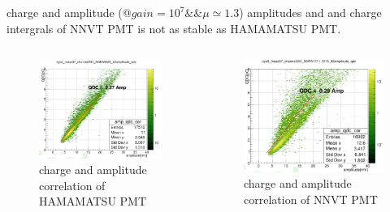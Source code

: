 \begin{frame}{charge and amplitude (@$gain=10^7\&\&\mu\simeq 1.3$)}
amplitudes and  and charge intergrals of NNVT PMT is not as stable as HAMAMATSU PMT.
\begin{columns}
\begin{column}{.5\textwidth}
\begin{figure}
\centering
\includegraphics[width=\textwidth]{figures/hamampqdc.png} %
\caption{charge and amplitude correlation of HAMAMATSU PMT}
\end{figure}
\end{column}
\begin{column}{.5\textwidth}
\begin{figure}
\centering
\includegraphics[width=\textwidth]{figures/mcpampqdc.png} %
\caption{charge and amplitude correlation of NNVT PMT}
\end{figure}
\end{column}
\end{columns}
\end{frame}
